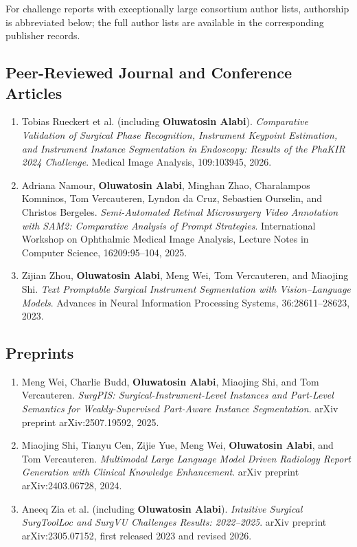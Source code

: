 For challenge reports with exceptionally large consortium author lists, authorship is abbreviated below; the full author lists are available in the corresponding publisher records.

\subsection*{Peer-Reviewed Journal and Conference Articles}

\begin{enumerate}
  \item Tobias Rueckert et al. (including \textbf{Oluwatosin Alabi}).
  \emph{Comparative Validation of Surgical Phase Recognition, Instrument Keypoint Estimation, and Instrument Instance Segmentation in Endoscopy: Results of the PhaKIR 2024 Challenge}.
  Medical Image Analysis, 109:103945, 2026.

  \item Adriana Namour, \textbf{Oluwatosin Alabi}, Minghan Zhao, Charalampos Komninos, Tom Vercauteren, Lyndon da Cruz, Sebastien Ourselin, and Christos Bergeles.
  \emph{Semi-Automated Retinal Microsurgery Video Annotation with SAM2: Comparative Analysis of Prompt Strategies}.
  International Workshop on Ophthalmic Medical Image Analysis, Lecture Notes in Computer Science, 16209:95--104, 2025.

  \item Zijian Zhou, \textbf{Oluwatosin Alabi}, Meng Wei, Tom Vercauteren, and Miaojing Shi.
  \emph{Text Promptable Surgical Instrument Segmentation with Vision--Language Models}.
  Advances in Neural Information Processing Systems, 36:28611--28623, 2023.
\end{enumerate}

\subsection*{Preprints}

\begin{enumerate}
  \item Meng Wei, Charlie Budd, \textbf{Oluwatosin Alabi}, Miaojing Shi, and Tom Vercauteren.
  \emph{SurgPIS: Surgical-Instrument-Level Instances and Part-Level Semantics for Weakly-Supervised Part-Aware Instance Segmentation}.
  arXiv preprint arXiv:2507.19592, 2025.

  \item Miaojing Shi, Tianyu Cen, Zijie Yue, Meng Wei, \textbf{Oluwatosin Alabi}, and Tom Vercauteren.
  \emph{Multimodal Large Language Model Driven Radiology Report Generation with Clinical Knowledge Enhancement}.
  arXiv preprint arXiv:2403.06728, 2024.

  \item Aneeq Zia et al. (including \textbf{Oluwatosin Alabi}).
  \emph{Intuitive Surgical SurgToolLoc and SurgVU Challenges Results: 2022--2025}.
  arXiv preprint arXiv:2305.07152, first released 2023 and revised 2026.
\end{enumerate}

